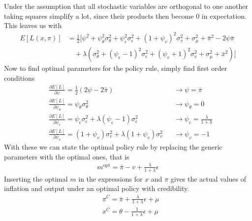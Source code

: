 \documentclass[12pt, a4paper]{article}
\begin{document}
\begin{spacing}{1.213}
Under the assumption that all stochastic variables are orthogonal to one another taking squares simplify a lot, since their products then become 0 in expectation. This leaves us with
\begin{align*}
E[L(x, \pi)] &= \frac{1}{2} [ \psi^2 + \psi_{\theta}^2 \sigma^2_{\theta} + \psi_{\epsilon}^2 \sigma^2_{\epsilon} + (1 + \psi_v)^2 \sigma^2_v + \sigma^2_{\mu} + \bar{\pi}^2 - 2\psi \bar{\pi}
\\
& \quad + \lambda(\sigma^2_{\theta} + (\psi_{\epsilon} -1)^2 \sigma^2_{\epsilon} + (\psi_v +1 )^2\sigma^2_v + \sigma^2_{\mu} + \bar{x}^2)  ]
\end{align*}
Now to find optimal parameters for the policy rule, simply find first order conditions 
\begin{align*}
&\frac{\partial E[L]}{\partial \psi} = \frac{1}{2} (2\psi - 2 \bar{\pi}) &&\rightarrow \psi = \bar{\pi} \\
& \frac{\partial E[L]}{\partial \psi_{\theta}} = \psi_{\theta}\sigma^2_{\theta} && \rightarrow \psi_{\theta} = 0 \\
& \frac{\partial E[L]}{\partial \psi_{\epsilon}} = \psi_{\epsilon}\sigma^2_{\epsilon} + \lambda(\psi_{\epsilon}-1)\sigma^2_{\epsilon} && \rightarrow \psi_{\epsilon} = \frac{\lambda}{1+ \lambda} \\
& \frac{\partial E[L]}{\partial \psi_{v}} = (1+\psi_v )\sigma^2_v + \lambda(1+ \psi_v)\sigma^2_v && \rightarrow \psi_v = -1
\end{align*}
With these we can state the optimal policy rule by replacing the generic parameters with the optimal ones, that is 
\begin{align*}
m^{\text{opt}} = \bar{\pi} - v + \frac{\lambda}{1+ \lambda} \epsilon
\end{align*}
Inserting the optimal $m$ in the expressions for $x$ and $\pi$ gives the actual values of inflation and output under an optimal policy with credibility.
\begin{align*}
&\pi^C = \bar{\pi} + \frac{\lambda}{1+\lambda} \epsilon + \mu \\
& x^C = \theta - \frac{1}{1+ \lambda}\epsilon + \mu
\end{align*}


\end{spacing}
\end{document}
